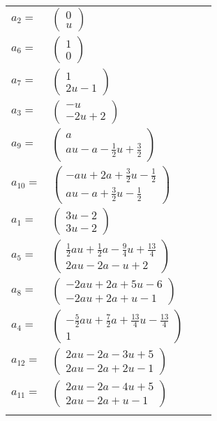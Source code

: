 \documentclass[1p]{elsarticle_modified}
\theoremstyle{definition}
\begin{document}
\begin{tabular}{m{7pt} m{180pt} m{7pt} m{180pt} }
\flushright $a_{2}=$&$\begin{pmatrix}0\\u\end{pmatrix}$ \\
\flushright $a_{6}=$&$\begin{pmatrix}1\\0\end{pmatrix}$ \\
\flushright $a_{7}=$&$\begin{pmatrix}1\\2 u-1\end{pmatrix}$ \\
\flushright $a_{3}=$&$\begin{pmatrix}- u\\-2 u+2\end{pmatrix}$ \\
\flushright $a_{9}=$&$\begin{pmatrix}a\\a u- a-\frac{1}{2} u+\frac{3}{2}\end{pmatrix}$ \\
\flushright $a_{10}=$&$\begin{pmatrix}- a u+2 a+\frac{3}{2} u-\frac{1}{2}\\a u- a+\frac{3}{2} u-\frac{1}{2}\end{pmatrix}$ \\
\flushright $a_{1}=$&$\begin{pmatrix}3 u-2\\3 u-2\end{pmatrix}$ \\
\flushright $a_{5}=$&$\begin{pmatrix}\frac{1}{2} a u+\frac{1}{2} a-\frac{9}{4} u+\frac{13}{4}\\2 a u-2 a- u+2\end{pmatrix}$ \\
\flushright $a_{8}=$&$\begin{pmatrix}-2 a u+2 a+5 u-6\\-2 a u+2 a+u-1\end{pmatrix}$ \\
\flushright $a_{4}=$&$\begin{pmatrix}-\frac{5}{2} a u+\frac{7}{2} a+\frac{13}{4} u-\frac{13}{4}\\1\end{pmatrix}$ \\
\flushright $a_{12}=$&$\begin{pmatrix}2 a u-2 a-3 u+5\\2 a u-2 a+2 u-1\end{pmatrix}$ \\
\flushright $a_{11}=$&$\begin{pmatrix}2 a u-2 a-4 u+5\\2 a u-2 a+u-1\end{pmatrix}$\\&\end{tabular}
\end{document}
